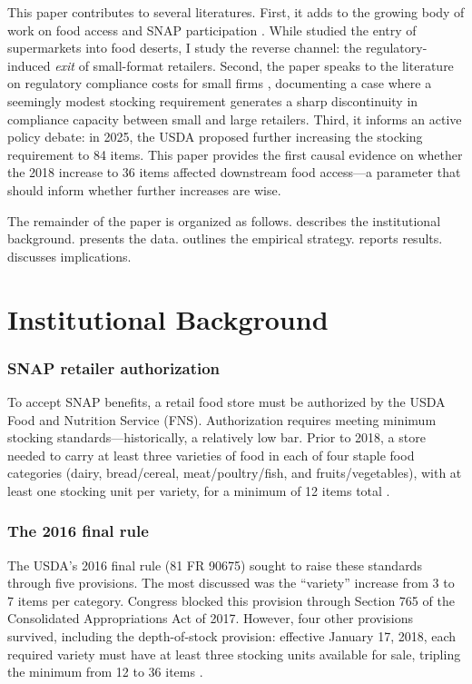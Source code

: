\documentclass[12pt]{article}
\begin{document}
This paper contributes to several literatures. First, it adds to the growing body of work on food access and SNAP participation \citep{allcott2019food, bitler2010does, currie2010effect, handbury2015goods, hoynes2016us}. While \citet{allcott2019food} studied the entry of supermarkets into food deserts, I study the reverse channel: the regulatory-induced \textit{exit} of small-format retailers. Second, the paper speaks to the literature on regulatory compliance costs for small firms \citep{djankov2002regulation, crain2010impact}, documenting a case where a seemingly modest stocking requirement generates a sharp discontinuity in compliance capacity between small and large retailers. Third, it informs an active policy debate: in 2025, the USDA proposed further increasing the stocking requirement to 84 items. This paper provides the first causal evidence on whether the 2018 increase to 36 items affected downstream food access---a parameter that should inform whether further increases are wise.

The remainder of the paper is organized as follows.  describes the institutional background.  presents the data.  outlines the empirical strategy.  reports results.  discusses implications.


\section{Institutional Background}
\label{sec:background}

\subsubsection*{SNAP retailer authorization} To accept SNAP benefits, a retail food store must be authorized by the USDA Food and Nutrition Service (FNS). Authorization requires meeting minimum stocking standards---historically, a relatively low bar. Prior to 2018, a store needed to carry at least three varieties of food in each of four staple food categories (dairy, bread/cereal, meat/poultry/fish, and fruits/vegetables), with at least one stocking unit per variety, for a minimum of 12 items total \citep{usda_fns_2016rule}.

\subsubsection*{The 2016 final rule} The USDA's 2016 final rule (81 FR 90675) sought to raise these standards through five provisions. The most discussed was the ``variety'' increase from 3 to 7 items per category. Congress blocked this provision through Section 765 of the Consolidated Appropriations Act of 2017. However, four other provisions survived, including the depth-of-stock provision: effective January 17, 2018, each required variety must have at least three stocking units available for sale, tripling the minimum from 12 to 36 items \citep{usda_fns_2016rule}.
\end{document}
